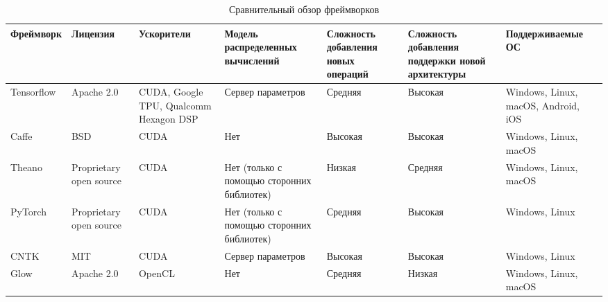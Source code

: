 \begin{sidewaystable}
\caption{Сравнительный обзор фреймворков}
\label{task:comp_table}
\begin{tabularx}{\textwidth}{@{}ZZZZZZZ@{}}
\toprule
\textbf{Фреймворк} & \textbf{Лицензия}       & \textbf{Ускорители}                    & \textbf{Модель распределенных вычислений}  & \textbf{Сложность добавления новых операций} & \textbf{Сложность добавления поддержки новой архитектуры} & \textbf{Поддерживаемые ОС}          \\ \midrule
Tensorflow         & Apache 2.0              & CUDA, Google TPU, Qualcomm Hexagon DSP & Сервер параметров                          & Средняя                                      & Высокая                                                   & Windows, Linux, macOS, Android, iOS \\
Caffe              & BSD                     & CUDA                                   & Нет                                        & Высокая                                      & Высокая                                                   & Windows, Linux, macOS               \\
Theano             & Proprietary open source & CUDA                                   & Нет (только с помощью сторонних библиотек) & Низкая                                       & Средняя                                                   & Windows, Linux, macOS               \\
PyTorch            & Proprietary open source & CUDA                                   & Нет (только с помощью сторонних библиотек)  & Средняя                                      & Высокая                                                   & Windows, Linux                      \\
CNTK               & MIT                     & CUDA                                   & Сервер параметров                          & Высокая                                      & Высокая                                                   & Windows, Linux                      \\
Glow               & Apache 2.0              & OpenCL                                 & Нет                                        & Средняя                                      & Низкая                                                    & Windows, Linux, macOS               \\ \bottomrule
\end{tabularx}
\end{sidewaystable}

